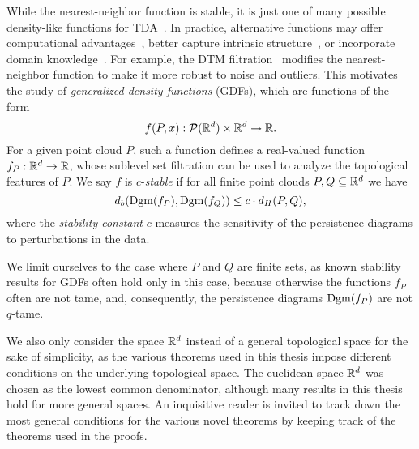 While the nearest-neighbor function is stable, it is just one of many possible
density-like functions for
TDA~\cite{anai2020dtm,hoefgeest2022christoffeldarbouxkerneltopologicaldata,phillips2015geometricinferencekerneldensity}.
In practice, alternative functions may offer computational
advantages~\cite{guibas2011witnessed,buchet2014efficientrobustpersistenthomology},
better capture intrinsic structure~\cite{anai2020dtm}, or incorporate domain
knowledge~\cite{fractalfract8120731}. For example, the DTM
filtration~\cite{anai2020dtm} modifies the nearest-neighbor function to make
it more robust to noise and outliers. This motivates the study of
\emph{generalized density functions} (GDFs), which are functions of the form
\begin{equation}
    f(P, x) : \mathcal{P}(\mathbb{R}^d) \times \mathbb{R}^d \to \mathbb{R}.
\end{equation}
For a given point cloud $P$, such a function defines a real-valued function
$f_P: \mathbb{R}^d \to \mathbb{R}$, whose sublevel set filtration can be used to analyze the
topological features of $P$. We say $f$ is $c$-\emph{stable} if for all finite
point clouds $P, Q \subseteq \mathbb{R}^d$ we have
\begin{equation}
    d_b(\operatorname{Dgm}(f_P), \operatorname{Dgm}(f_Q)) \leq c \cdot d_H(P, Q),
\end{equation}
where the \emph{stability constant} $c$ measures the sensitivity of the
persistence diagrams to perturbations in the data.

We limit ourselves to the case where $P$ and $Q$ are finite sets, as known
stability results for GDFs often hold only in this case, because otherwise the
functions $f_P$ often are not tame, and, consequently, the persistence diagrams
$\operatorname{Dgm}(f_P)$ are not $q$-tame.

We also only consider the space $\mathbb{R}^d$ instead of a general topological space
for the sake of simplicity, as the various theorems used in this thesis impose
different conditions on the underlying topological space. The euclidean space
$\mathbb{R}^d$ was chosen as the lowest common denominator, although many results in
this thesis hold for more general spaces. An inquisitive reader is invited to
track down the most general conditions for the various novel theorems by keeping
track of the theorems used in the proofs.

